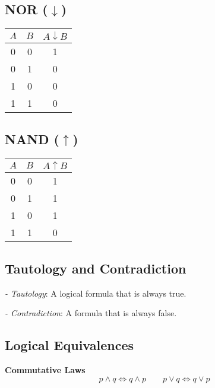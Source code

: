 \begin{multicols}{2}
	\vspace{1em}

	\subsection*{NOR ($\downarrow$)}

	\begin{tabular}{ccc}
		\toprule
		$A$ & $B$ & $A \downarrow B$ \\
		\midrule
		0   & 0   & 1                \\
		0   & 1   & 0                \\
		1   & 0   & 0                \\
		1   & 1   & 0                \\
		\bottomrule
	\end{tabular}

	\vspace{1em}

	\subsection*{NAND ($\uparrow$)}

	\begin{tabular}{ccc}
		\toprule
		$A$ & $B$ & $A \uparrow B$ \\
		\midrule
		0   & 0   & 1              \\
		0   & 1   & 1              \\
		1   & 0   & 1              \\
		1   & 1   & 0              \\
		\bottomrule
	\end{tabular}

\end{multicols}
\medskip
\subsection{Tautology and Contradiction}

\textit{- Tautology}: A logical formula that is always true.

\textit{- Contradiction}: A formula that is always false.

\newpage
\subsection{Logical Equivalences}
\textbf{Commutative Laws}
\[
	p \land q \Leftrightarrow q \land p \qquad p \lor q \Leftrightarrow q \lor p
\]

